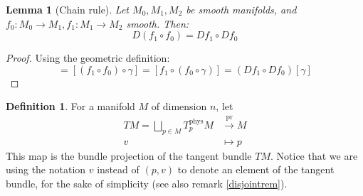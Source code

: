 \documentclass[a4paper,11pt,titlepage, article, oneside]{memoir}
\numberwithin{equation}{section}
\newtheorem{lemma}[theorem]{Lemma}
\theoremstyle{definition}
\newtheorem{definition}[theorem]{Definition}
\theoremstyle{remark}
\newcommand{\tangentphys}[1]{T_{#1}^{\text{phys}}}
\begin{document}
\begin{lemma}[Chain rule]
Let $M_0, M_1, M_2$ be smooth manifolds, and $f_0 \colon M_0 \rightarrow M_1, f_1 \colon M_1 \rightarrow M_2$ smooth. Then:
$$D(f_1 \circ f_0) = Df_1 \circ Df_0$$
\end{lemma}
\begin{proof}
Using the geometric definition:
\begin{equation*}
[D(f_1 \circ f_0)][\gamma] = [(f_1 \circ f_0) \circ \gamma] = [f_1 \circ (f_0 \circ \gamma)] = (Df_1 \circ Df_0)[\gamma]
\end{equation*}
\end{proof}

\begin{definition}
For a manifold $M$ of dimension $n$, let 
\begin{align}
TM = \bigsqcup_{p \in M} \tangentphys{p} M & \overset{\text{pr}}{\longrightarrow} M \\
v &\longmapsto p \nonumber
\end{align}
This map is the bundle projection of the tangent bundle $TM$. Notice that we are using the notation $v$ instead of $(p, v)$ to denote an element of the tangent bundle, for the sake of simplicity (see also remark \ref{disjointrem}).
\end{definition}
\end{document}
